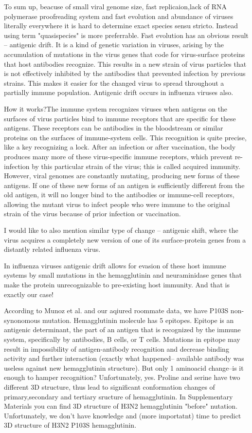 \documentclass{article}
\begin{document}
To sum up, beacuse of small viral genome size, fast replicaion,lack of RNA polymerase proofreading system and fast evolution and abundance of viruses literally everywhere it is hard to determine exact species sensu stricto. Instead using term "quasispecies" is more preferrable. Fast evolution has an obvious result -- antigenic drift.
It is a kind of genetic variation in viruses, arising by the accumulation of mutations in the virus genes that code for virus-surface proteins that host antibodies recognize. This results in a new strain of virus particles that is not effectively inhibited by the antibodies that prevented infection by previous strains. This makes it easier for the changed virus to spread throughout a partially immune population. Antigenic drift occurs in influenza viruses also.

How it works?The immune system recognizes viruses when antigens on the surfaces of virus particles bind to immune receptors that are specific for these antigens. These receptors can be antibodies in the bloodstream or similar proteins on the surfaces of immune-system cells. This recognition is quite precise, like a key recognizing a lock. After an infection or after vaccination, the body produces many more of these virus-specific immune receptors, which prevent re-infection by this particular strain of the virus; this is called acquired immunity. However, viral genomes are constantly mutating, producing new forms of these antigens. If one of these new forms of an antigen is sufficiently different from the old antigen, it will no longer bind to the antibodies or immune-cell receptors, allowing the mutant virus to infect people who were immune to the original strain of the virus because of prior infection or vaccination.

I would like to also mention similar type of change -- antigenic shift, where the virus acquires a completely new version of one of its surface-protein genes from a distantly related influenza virus.

In influenza viruses antigenic drift allows for evasion of these host immune systems by small mutations in the hemagglutinin and neuraminidase genes that make the protein unrecognizable to pre-existing host immunity. And that is exactly our case!

According to Munoz et al. \cite{mun} and our aqiured roommate data, we have P103S non-synonomous mutation. Hemagglutinin molecule has 5 epitopes. Epitope is an antigenic determinant, the part of an antigen that is recognized by the immune system, specifically by antibodies, B cells, or T cells. Mutations in epitope may result in impossibility of antigen-antibody recognition and decrease binding activity and further interaction (exactly what happened-- available antibody was useless against new hemagglutinin structure). But only 1 aminoacid change--is it enough to hamper recognition? Unfortunately, yes. Proline and serine have two different 3D structure, thus lead to significant conformation changes of primary,secondary and tertiary sructure of hemagglutinin. In Supplementary Materials you can find 3D structure of H3N2 hemagglutinin "before" nutation. Unfortunately, we don't have knowledge and (more importatnt) time to predict 3D structure of H3N2 P103S hemagglutinin. 
\end{document}
